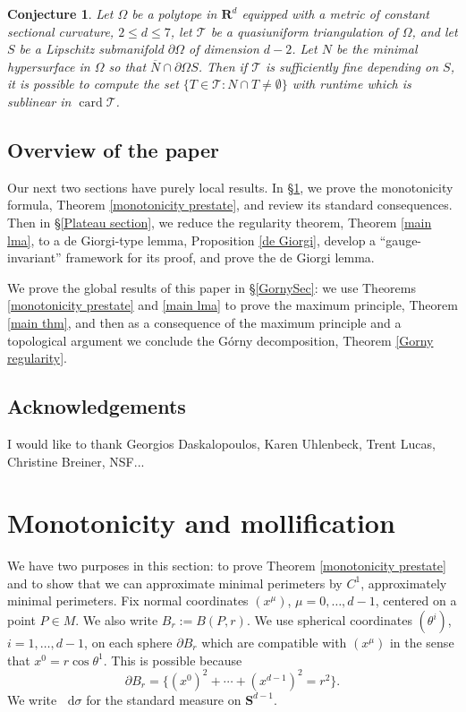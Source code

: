 \documentclass[reqno,10pt]{amsart}
\newcommand{\RR}{\mathbf{R}}
\newcommand{\Sph}{\mathbf S}
\DeclareMathOperator{\card}{card}
\newcommand*\dif{\mathop{}\!\mathrm{d}}
\newtheorem{conjecture}[theorem]{Conjecture}
\theoremstyle{definition}
\numberwithin{equation}{section}
\begin{document}
\begin{conjecture}
Let $\Omega$ be a polytope in $\RR^d$ equipped with a metric of constant sectional curvature, $2 \leq d \leq 7$, let $\mathcal T$ be a quasiuniform triangulation of $\Omega$, and let $S$ be a Lipschitz submanifold $\partial \Omega$ of dimension $d - 2$.
Let $N$ be the minimal hypersurface in $\Omega$ so that $\overline N \cap \partial \Omega S$.
Then if $\mathcal T$ is sufficiently fine depending on $S$, it is possible to compute the set $\{T \in \mathcal T: N \cap T \neq \emptyset\}$ with runtime which is sublinear in $\card \mathcal T$.
\end{conjecture}


\subsection{Overview of the paper}
Our next two sections have purely local results.
In \S\ref{MollifierSection}, we prove the monotonicity formula, Theorem \ref{monotonicity prestate}, and review its standard consequences.
Then in \S\ref{Plateau section}, we reduce the regularity theorem, Theorem \ref{main lma}, to a de Giorgi-type lemma, Proposition \ref{de Giorgi}, develop a ``gauge-invariant'' framework for its proof, and prove the de Giorgi lemma.

We prove the global results of this paper in \S\ref{GornySec}: we use Theorems \ref{monotonicity prestate} and \ref{main lma} to prove the maximum principle, Theorem \ref{main thm}, and then as a consequence of the maximum principle and a topological argument we conclude the G\'orny decomposition, Theorem \ref{Gorny regularity}.


\subsection{Acknowledgements}
I would like to thank Georgios Daskalopoulos, Karen Uhlenbeck, Trent Lucas, Christine Breiner, NSF...





\section{Monotonicity and mollification}\label{MollifierSection}
We have two purposes in this section: to prove Theorem \ref{monotonicity prestate} and to show that we can approximate minimal perimeters by $C^1$, approximately minimal perimeters.
Fix normal coordinates $(x^\mu)$, $\mu = 0, \dots, d - 1$, centered on a point $P \in M$.
We also write $B_r := B(P, r)$.
We use spherical coordinates $(\theta^i)$, $i = 1, \dots, d - 1$, on each sphere $\partial B_r$ which are compatible with $(x^\mu)$ in the sense that $x^0 = r \cos \theta^1$.
This is possible because
\begin{equation}\label{partial Br is a variety}
\partial B_r = \{(x^0)^2 + \cdots + (x^{d - 1})^2 = r^2\}.
\end{equation}
We write $\dif \sigma$ for the standard measure on $\Sph^{d - 1}$.
\end{document}
